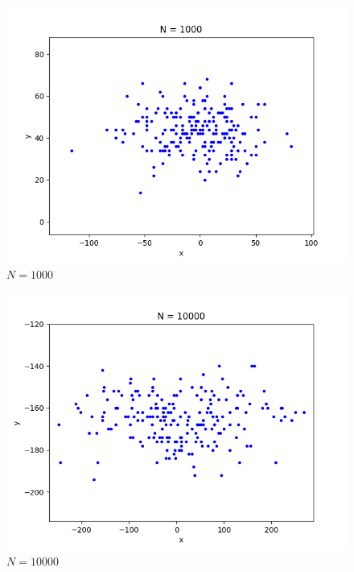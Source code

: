 \documentclass[a4j,titlepage]{jsarticle}
\begin{document}
\begin{figure}[H]
  \centering
  \includegraphics[width=13cm]{n1000.png}
  \caption{$N = 1000$}
  \label{fig:1000}
\end{figure}

\begin{figure}[H]
  \centering
  \includegraphics[width=13cm]{n10000.png}
  \caption{$N = 10000$}
  \label{fig:10000}
\end{figure}
\end{document}
